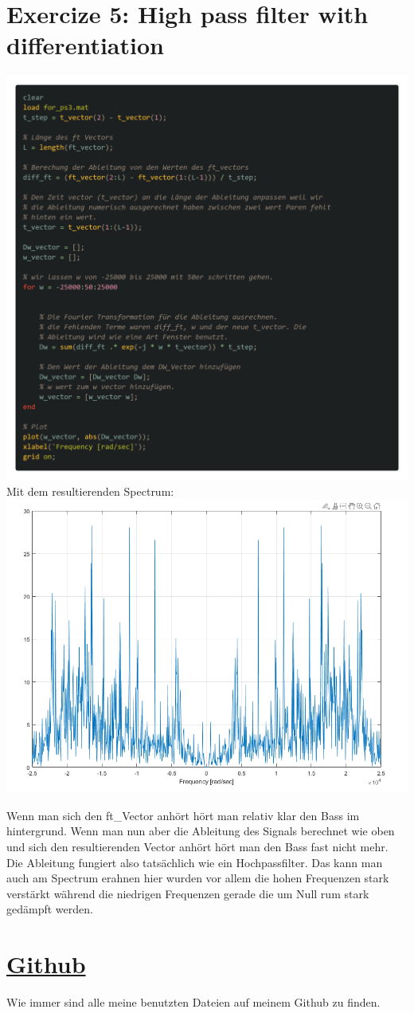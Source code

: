 \documentclass{scrartcl}
\begin{document}
\section*{Exercize 5: High pass filter with differentiation} 
\includegraphics[scale=0.24]{codem5.png}\\
Mit dem resultierenden Spectrum:\\
\includegraphics[scale=0.5]{spectrumM5.png}

Wenn man sich den ft\_Vector anhört hört man relativ klar den Bass im hintergrund. Wenn man nun aber die Ableitung des Signals berechnet wie oben und sich den resultierenden Vector anhört hört man den Bass fast nicht mehr. Die Ableitung fungiert also tatsächlich wie ein Hochpassfilter. Das kann man auch am Spectrum erahnen hier wurden vor allem die hohen Frequenzen stark verstärkt während die niedrigen Frequenzen gerade die um Null rum stark gedämpft werden.

\section*{\href{https://github.com/7hands/Angewandte-Modellierung-25-Colmant}{Github}}
Wie immer sind alle meine benutzten Dateien auf meinem Github zu finden.
\end{document}
